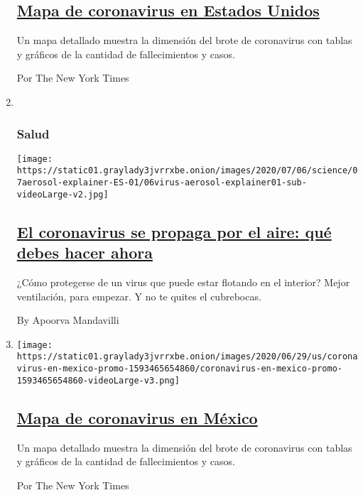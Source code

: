 \begin{enumerate}
  \hypertarget{mapa-de-coronavirus-en-estados-unidos}{%
  \subsection{\texorpdfstring{\href{/es/interactive/2020/espanol/mundo/coronavirus-en-estados-unidos.html}{Mapa
  de coronavirus en Estados
  Unidos}}{Mapa de coronavirus en Estados Unidos}}\label{mapa-de-coronavirus-en-estados-unidos}}

  Un mapa detallado muestra la dimensión del brote de coronavirus con
  tablas y gráficos de la cantidad de fallecimientos y casos.

  Por The New York Times
\item ~
  \hypertarget{salud}{%
  \subsubsection{Salud}\label{salud}}

  \texttt{[image: https://static01.graylady3jvrrxbe.onion/images/2020/07/06/science/07aerosol-explainer-ES-01/06virus-aerosol-explainer01-sub-videoLarge-v2.jpg]}

  \hypertarget{el-coronavirus-se-propaga-por-el-aire-quuxe9-debes-hacer-ahora}{%
  \subsection{\texorpdfstring{\href{/es/2020/07/08/espanol/ciencia-y-tecnologia/coronavirus-aire-aerosoles.html}{El
  coronavirus se propaga por el aire: qué debes hacer
  ahora}}{El coronavirus se propaga por el aire: qué debes hacer ahora}}\label{el-coronavirus-se-propaga-por-el-aire-quuxe9-debes-hacer-ahora}}

  ¿Cómo protegerse de un virus que puede estar flotando en el interior?
  Mejor ventilación, para empezar. Y no te quites el cubrebocas.

  By Apoorva Mandavilli
\item
  \texttt{[image: https://static01.graylady3jvrrxbe.onion/images/2020/06/29/us/coronavirus-en-mexico-promo-1593465654860/coronavirus-en-mexico-promo-1593465654860-videoLarge-v3.png]}

  \hypertarget{mapa-de-coronavirus-en-muxe9xico}{%
  \subsection{\texorpdfstring{\href{/es/interactive/2020/espanol/america-latina/coronavirus-en-mexico.html}{Mapa
  de coronavirus en
  México}}{Mapa de coronavirus en México}}\label{mapa-de-coronavirus-en-muxe9xico}}

  Un mapa detallado muestra la dimensión del brote de coronavirus con
  tablas y gráficos de la cantidad de fallecimientos y casos.

  Por The New York Times
\end{enumerate}

